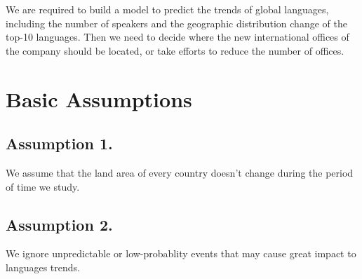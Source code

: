 \documentclass{mcmthesis}
\begin{document}
  We are required to build a model to predict the trends of global languages, including the number of speakers and the geographic distribution change of the top-10 languages. Then we need to decide where the new international offices of the company should be located, or take efforts to reduce the number of offices.



\section{Basic Assumptions}
\subsection{Assumption 1.}

  We assume that the land area of every country doesn't change during the period of time we study.

\subsection{Assumption 2.}

  We ignore unpredictable or low-probablity events that may cause great impact to languages trends.




\end{document}
